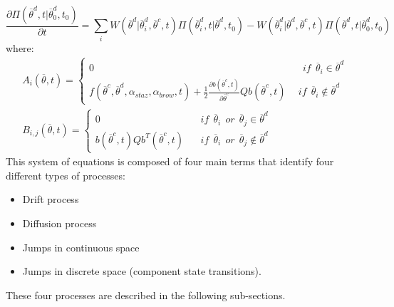 \begin{equation}
\frac{\partial \Pi \left (\overline{\theta}^{d},t|\overline{\theta}_{0}^{d},t_{0}  
\right ) }{\partial t} =
\sum_{i} W\left ( \overline{\theta}^{d}|
\overline{\theta}^{d}_{i},\overline{\theta}^{c},t \right ) \Pi \left (\overline{\theta}^{d}_{i},t|\overline{\theta}^{d},t_{0}  
\right ) - W\left ( \overline{\theta}^{d}_{i}|
\overline{\theta}^{d},\overline{\theta}^{c},t \right ) \Pi \left (\overline{\theta}^{d},t|\overline{\theta}^{d}_{0},t_{0}  
\right ) 
\end{equation}
where:
\begin{equation}
\begin{matrix}
A_{i}\left ( \overline{\theta}, t \right ) = \left\{\begin{matrix}
0 & \: \: if  \: \: \overline{\theta}_{i} \in \overline{\theta}^{d} 
\\ 
f\left ( \overline{\theta}^{c},\overline{\theta}^{d},\alpha_{staz},\alpha_{brow},t \right ) +\frac{1}{2}\frac{\partial b\left ( \overline{\theta}^{c},t \right )}{\partial \overline{\theta}^{c}}Qb\left ( \overline{\theta}^{c},t \right ) \: \: & if  \: \: \overline{\theta}_{i} \notin \overline{\theta}^{d} 
\end{matrix}\right.
\\ 
B_{i,j}\left ( \overline{\theta}, t \right ) = \left\{\begin{matrix}
0 & \: \: if  \: \: \overline{\theta}_{i} \: \: or \: \: \overline{\theta}_{j}  \in \overline{\theta}^{d} 
\\ 
b\left ( \overline{\theta}^{c},t \right )Qb^{T}\left (  \overline{\theta}^{c},t \right ) \: \: & \: \: if  \: \: \overline{\theta}_{i} \: \: or \: \: \overline{\theta}_{j}  \notin \overline{\theta}^{d} 
\end{matrix}\right.
\end{matrix}
\end{equation}
This system of equations is composed of four main terms that identify four different types of processes:
\begin{itemize}
  \item Drift process
  \item Diffusion process
  \item Jumps in continuous space
  \item Jumps in discrete space (component state transitions).
\end{itemize}
 These four processes are described in the following sub-sections.
%
%
%
%
